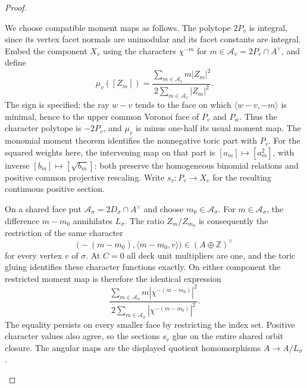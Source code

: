 \documentclass[11pt,a4paper]{article}
\theoremstyle{definition}
\begin{document}
\begin{proof}
\begin{enumerate}[label=\arabic*.]
We choose compatible moment maps as follows.  The polytope $2P_v$
is integral, since its vertex facet normals are unimodular and its
facet constants are integral.  Embed the component $X_v$ using the
characters $\chi^{-m}$ for
$m\in\mathcal A_v=2P_v\cap A^\vee$, and define
\[
 \mu_v([Z_m])=
 \frac{\sum_{m\in\mathcal A_v}m|Z_m|^2}
 {2\sum_{m\in\mathcal A_v}|Z_m|^2}.
\]
The sign is specified: the ray $w-v$ tends to the face on which
$\langle w-v,-m\rangle$ is minimal, hence to the upper common
Voronoi face of $P_v$ and $P_w$.  Thus the character polytope is
$-2P_v$, and $\mu_v$ is minus one-half its usual moment map.
The monomial moment theorem
\cite[equations (12.2.3)--(12.2.4) and Theorem 12.2.5, p.~571]{CoxLittleSchenck2011}
identifies the nonnegative toric part with $P_v$.
For the squared weights here, the intervening map on that part is
$[a_m]\mapsto[a_m^2]$, with inverse $[b_m]\mapsto[\sqrt{b_m}]$:
both preserve the homogeneous binomial relations and positive common
projective rescaling.  Write $s_v:P_v\to X_v$ for the resulting
continuous positive section.

On a shared face put
$\mathcal A_\sigma=2D_\sigma\cap A^\vee$ and choose
$m_0\in\mathcal A_\sigma$.
For $m\in\mathcal A_\sigma$, the difference $m-m_0$ annihilates
$L_\sigma$.  The ratio $Z_m/Z_{m_0}$ is consequently the restriction
of the same character
\[
 \bigl(-(m-m_0),\langle m-m_0,v\rangle\bigr)
       \in(A\oplus\mathbb Z)^\vee
\]
for every vertex $v$ of $\sigma$.  At $C=0$ all deck unit multipliers are one, and the toric gluing
identifies these character functions exactly.  On either component
the restricted moment map is therefore the identical expression
\[
 \frac{\sum_{m\in\mathcal A_\sigma}
       m|\chi^{-(m-m_0)}|^2}
 {2\sum_{m\in\mathcal A_\sigma}|\chi^{-(m-m_0)}|^2}.
\]
The equality persists on every smaller face by restricting the index
set.  Positive character values also agree, so the sections $s_v$
glue on the entire shared orbit closure.  The angular maps are the
displayed quotient homomorphisms $A\to A/L_\sigma$.


\end{enumerate}
\end{proof}
\end{document}
